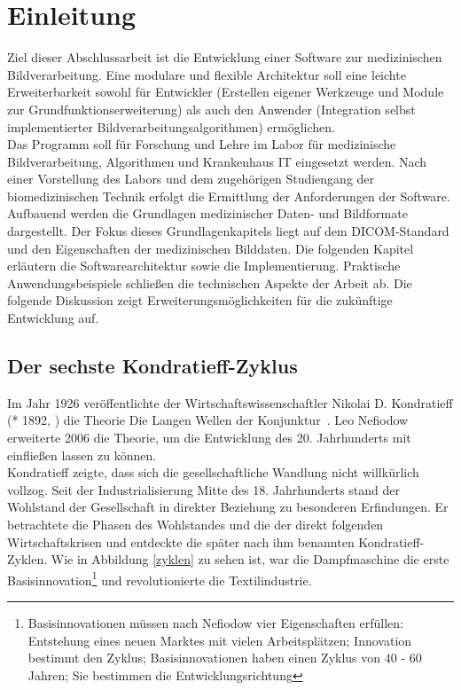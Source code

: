 \chapter{Einleitung}\label{einleitung}

Ziel dieser Abschlussarbeit ist die Entwicklung einer Software zur medizinischen Bildverarbeitung. Eine modulare und flexible Architektur soll eine leichte Erweiterbarkeit sowohl für Entwickler (Erstellen eigener Werkzeuge und Module zur Grundfunktionserweiterung) als auch den Anwender (Integration selbst implementierter Bildverarbeitungsalgorithmen) ermöglichen.\\
Das Programm soll für Forschung und Lehre im Labor für medizinische Bildverarbeitung, Algorithmen und Krankenhaus IT eingesetzt werden. Nach einer Vorstellung des Labors und dem zugehörigen Studiengang der biomedizinischen Technik erfolgt die Ermittlung der Anforderungen der Software. Aufbauend werden die Grundlagen medizinischer Daten- und Bildformate dargestellt. Der Fokus dieses Grundlagenkapitels liegt auf dem DICOM-Standard und den Eigenschaften der medizinischen Bilddaten. Die folgenden Kapitel erläutern die Softwarearchitektur sowie die Implementierung. Praktische Anwendungsbeispiele schließen die technischen Aspekte der Arbeit ab. Die folgende Diskussion zeigt Erweiterungsmöglichkeiten für die zukünftige Entwicklung auf.

\section{Der sechste Kondratieff-Zyklus}
Im Jahr 1926 veröffentlichte der Wirtschaftswissenschaftler Nikolai D. Kondratieff (* 1892, ) die Theorie \glqq Die Langen Wellen der Konjunktur\grqq\ \cite{hensen:gesundeGesellschaft}.
Leo Nefiodow erweiterte 2006 die Theorie, um die Entwicklung des 20. Jahrhunderts mit einfließen lassen zu können.\\
Kondratieff zeigte, dass sich die gesellschaftliche Wandlung nicht willkürlich vollzog. Seit der Industrialisierung Mitte des 18. Jahrhunderts stand der Wohlstand der Gesellschaft in direkter Beziehung zu besonderen Erfindungen. Er betrachtete die Phasen des Wohlstandes und die der direkt folgenden Wirtschaftskrisen und entdeckte die später nach ihm benannten \glqq Kondratieff-Zyklen\grqq.
Wie in Abbildung \ref{zyklen} zu sehen ist, war die Dampfmaschine die erste Basisinnovation\footnote{Basisinnovationen müssen nach Nefiodow vier Eigenschaften erfüllen: Entstehung eines neuen Marktes mit vielen Arbeitsplätzen; Innovation bestimmt den Zyklus; Basisinnovationen haben einen Zyklus von 40 - 60 Jahren; Sie bestimmen die Entwicklungsrichtung} und revolutionierte die Textilindustrie.\cite{wieden:liquidwork}

